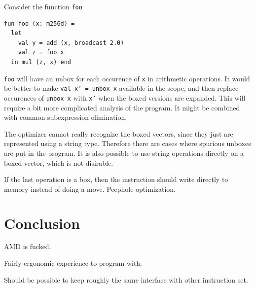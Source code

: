 \documentclass{article}
\begin{document}
Consider the function \texttt{foo}
\begin{lstlisting}
fun foo (x: m256d) =
  let
    val y = add (x, broadcast 2.0)
    val z = foo x
  in mul (z, x) end
\end{lstlisting}

\texttt{foo} will have an unbox for each occurence of \texttt{x} in arithmetic operations. It would be better to make \texttt{val x' = unbox x} available in the scope, and then replace occurences of \texttt{unbox x} with \texttt{x'} when the boxed versions are expanded. This will require a bit more complicated analysis of the program. It might be combined with common subexpression elimination.

The optimizer cannot really recognize the boxed vectors, since they just are represented using a string type. Therefore there are cases where spurious unboxes are put in the program. It is also possible to use string operations directly on a boxed vector, which is not disirable.

If the last operation is a box, then the instruction should write directly to memory instead of doing a move. Peephole optimization.

\section{Conclusion}

AMD is fucked.

Fairly ergonomic experience to program with.

Should be possible to keep roughly the same interface with other instruction set.




\end{document}
